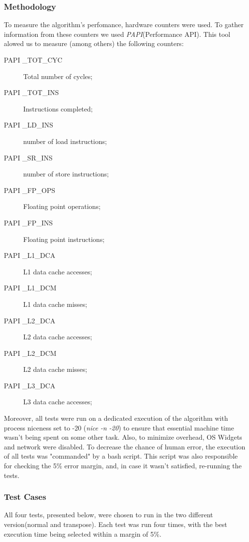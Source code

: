 \documentclass[a4paper,10pt,openright,openbib,twocolumn]{article}
\begin{document}
\subsubsection{Methodology}
To measure the algorithm's perfomance, hardware counters were used. To gather information from these counters we used \emph{PAPI}(Performance API). This tool alowed us to measure (among others) the following counters:
\begin{description}
\item[PAPI \_TOT\_CYC] Total number of cycles;
\item[PAPI \_TOT\_INS] Instructions completed;
\item[PAPI \_LD\_INS] number of load instructions;
\item[PAPI \_SR\_INS] number of store instructions;
\item[PAPI \_FP\_OPS] Floating point operations;
\item[PAPI \_FP\_INS] Floating point instructions;
\item[PAPI \_L1\_DCA] L1 data cache accesses;
\item[PAPI \_L1\_DCM] L1 data cache misses;
\item[PAPI \_L2\_DCA] L2 data cache accesses;
\item[PAPI \_L2\_DCM] L2 data cache misses;
\item[PAPI \_L3\_DCA] L3 data cache accesses;
\end{description}

Moreover, all tests were run on a dedicated execution of the algorithm with process niceness set to -20 (\emph{nice -n -20}) to ensure that essential machine time wasn't being spent on some other task. Also, to minimize overhead, OS Widgets and network were disabled. To decrease the chance of human error, the execution of all tests was "commanded" by a bash script. This script was also responsible for checking the 5\% error margin, and, in case it wasn't satisfied, re-running the tests.


\subsubsection{Test Cases}

All four tests, presented below, were chosen to run in the two different version(normal and transpose). Each test was run four times, with the best execution time being selected within a margin of 5\%.
\begin{table}[!htp]
\end{table}
\end{document}
